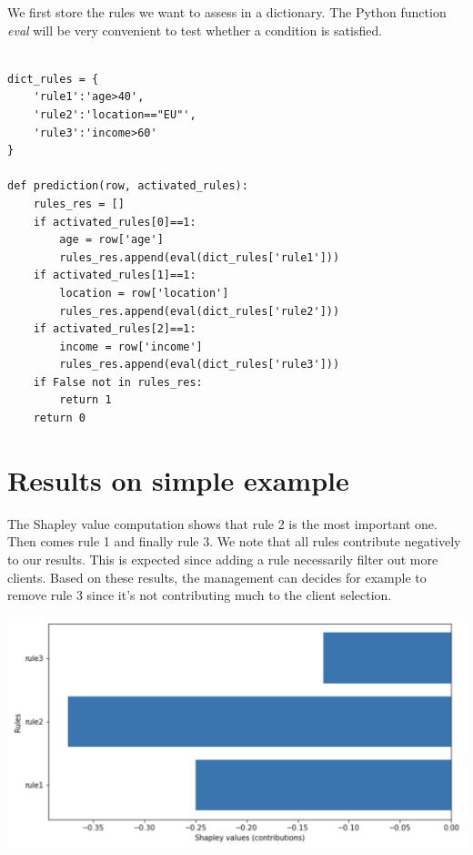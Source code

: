 We first store the rules we want to assess in a dictionary. The Python function \textit{eval} will be very convenient to test whether a condition is satisfied.

\lstset{language=Python}
\lstset{frame=lines}
\lstset{basicstyle=\footnotesize}
\begin{lstlisting}

dict_rules = {
    'rule1':'age>40',
    'rule2':'location=="EU"',
    'rule3':'income>60'
}

def prediction(row, activated_rules):
    rules_res = []
    if activated_rules[0]==1:
        age = row['age']
        rules_res.append(eval(dict_rules['rule1']))
    if activated_rules[1]==1:
        location = row['location']
        rules_res.append(eval(dict_rules['rule2']))
    if activated_rules[2]==1:
        income = row['income']
        rules_res.append(eval(dict_rules['rule3']))
    if False not in rules_res:
        return 1
    return 0

\end{lstlisting}

\section{Results on simple example}

\label{sec:results-simple-example}

The Shapley value computation shows that rule 2 is the most important one. Then comes rule 1 and finally rule 3. We note that all rules contribute negatively to our results. This is expected since adding a rule necessarily filter out more clients. Based on these results, the management can decides for example to remove rule 3 since it's not contributing much to the client selection.

\begin{center}
\includegraphics[scale=0.6]{shapley-results.png}
\end{center}


